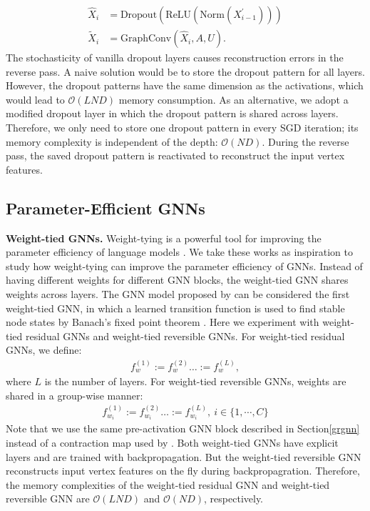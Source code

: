 \documentclass{article}
\newcommand{\secLabel}{Section\xspace}
\newcommand{\mysection}[1]{\vspace{0pt}\noindent\textbf{#1.}}
\begin{document}
\begin{align}
\widehat{X}_{i} &= \text{Dropout}(\text{ReLU}(\text{Norm}(X_{i-1}^{\prime}))) \\
\widetilde{X}_{i} &= \text{GraphConv}(\widehat{X}_{i}, A, U).
\end{align}
The stochasticity of vanilla dropout layers causes reconstruction errors in the reverse pass. A naive solution would be to store the dropout pattern for all layers. However, the dropout patterns have the same dimension as the activations, which would lead to $\mathcal{O}(LND)$ memory consumption.
As an alternative, we adopt a modified dropout layer in which the dropout pattern is shared across layers. Therefore, we only need to store one dropout pattern in every SGD iteration; its memory complexity is independent of the depth: $\mathcal{O}(ND)$. During the reverse pass, the saved dropout pattern is reactivated to reconstruct the input vertex features.

\subsection{Parameter-Efficient GNNs}
\mysection{Weight-tied GNNs}
Weight-tying is a powerful tool for improving the parameter efficiency of language models \citep{press2017using,inan2016tying,bai2018trellis}. We take these works as inspiration to study how weight-tying can improve the parameter efficiency of GNNs. Instead of having different weights for different GNN blocks, the weight-tied GNN shares weights across layers. The GNN model proposed by \citet{scarselli2008graph} can be considered the first weight-tied GNN, in which a learned transition function is used to find stable node states by Banach's fixed point theorem \citep{khamsi2001introduction}. Here we experiment with weight-tied residual GNNs and weight-tied reversible GNNs. For weight-tied residual GNNs, we define:
\begin{align}
f_{w}^{(1)} := f_{w}^{(2)} \ldots := f_{w}^{(L)},
\end{align}
where $L$ is the number of layers. For weight-tied reversible GNNs, weights are shared in a group-wise manner:
\begin{align}
f_{w_{i}}^{(1)} := f_{w_{i}}^{(2)} \ldots := f_{w_{i}}^{(L)},~ i \in \{1,\cdots,C\} 
\end{align}
Note that we use the same pre-activation GNN block described in \secLabel \ref{grgnn} instead of a contraction map used by \citet{scarselli2008graph}. Both weight-tied GNNs have explicit layers and are trained with backpropagation. But the weight-tied reversible GNN reconstructs input vertex features on the fly during backpropagration. Therefore, the memory complexities of the weight-tied residual GNN and weight-tied reversible GNN are $\mathcal{O}(LND)$ and $\mathcal{O}(ND)$, respectively.
\end{document}
